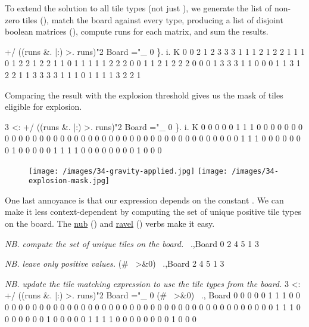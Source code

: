 \documentclass{article}
\begin{document}
To extend the solution to all tile types (not just ), we generate the list of non-zero tiles (),
match the board against every type, producing a list of disjoint boolean matrices (),
compute runs for each matrix,
and sum the results.

\begin{code}[j]
   +/ ((runs &. |:) >. runs)"2 Board ="_ 0 \}. i. K
0 0 2 1 2 3 3 3 1
1 1 2 1 2 2 1 1 1
0 1 2 2 1 2 2 1 1
0 1 1 1 1 1 2 2 2
0 0 1 1 2 1 2 2 2
0 0 0 1 3 3 3 1 1
0 0 0 1 1 3 1 2 2
1 1 3 3 3 3 1 1 1
0 1 1 1 1 3 2 2 1
\end{code}

Comparing the result with the explosion threshold gives us the mask of tiles eligible for explosion.

\begin{code}[j]
   3 <: +/ ((runs &. |:) >. runs)"2 Board ="_ 0 \}. i. K
0 0 0 0 0 1 1 1 0
0 0 0 0 0 0 0 0 0
0 0 0 0 0 0 0 0 0
0 0 0 0 0 0 0 0 0
0 0 0 0 0 0 0 0 0
0 0 0 0 1 1 1 0 0
0 0 0 0 0 1 0 0 0
0 0 1 1 1 1 0 0 0
0 0 0 0 0 1 0 0 0
\end{code}

\begin{figure}
\texttt{[image: /images/34-gravity-applied.jpg]}
\texttt{[image: /images/34-explosion-mask.jpg]}
\end{figure}

One last annoyance is that our expression depends on the constant .
We can make it less context-dependent by computing the set of unique positive tile types on the board.
The \href{https://code.jsoftware.com/wiki/Vocabulary/tildedot}{nub} () and \href{https://code.jsoftware.com/wiki/Vocabulary/comma}{ravel} (\code{,}) verbs make it easy.

\begin{code}[j]
   \emph{NB. compute the set of unique tiles on the board.}
   ~.,Board
0 2 4 5 1 3

   \emph{NB. leave only positive values.}
   (#~ >&0) ~.,Board
2 4 5 1 3

   \emph{NB. update the tile matching expression to use the tile types from the board.}
   3 <: +/ ((runs &. |:) >. runs)"2 Board ="_ 0 (#~ >&0) ~., Board
0 0 0 0 0 1 1 1 0
0 0 0 0 0 0 0 0 0
0 0 0 0 0 0 0 0 0
0 0 0 0 0 0 0 0 0
0 0 0 0 0 0 0 0 0
0 0 0 0 1 1 1 0 0
0 0 0 0 0 1 0 0 0
0 0 1 1 1 1 0 0 0
0 0 0 0 0 1 0 0 0
\end{code}
\end{document}
